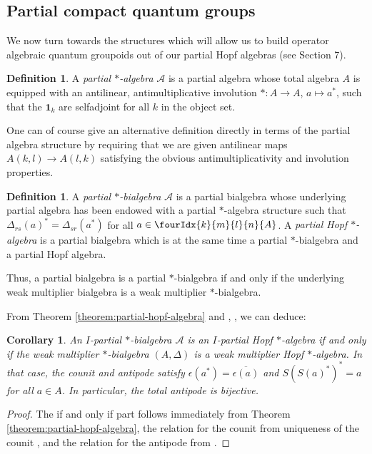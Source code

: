 \documentclass[11pt]{article}
\newcommand{\Gr}[5]{\fourIdx{#2}{#4}{#3}{#5}{#1}}%
\newtheorem{Cor}[Theorem]{Corollary}
\theoremstyle{definition}
\newtheorem{Def}[Theorem]{Definition}
\numberwithin{equation}{section}
\begin{document}
\subsection{Partial compact quantum groups}

We now turn towards the structures which will allow us to build operator algebraic quantum groupoids out of our partial Hopf algebras (see Section 7).
 
\begin{Def} A \emph{partial $*$-algebra} $\mathscr{A}$ is a partial
  algebra whose total algebra $A$ is equipped with an antilinear,
  antimultiplicative involution $*\colon A\rightarrow A$, $ a\mapsto
  a^*$,  such that the $\mathbf{1}_k$ are selfadjoint for all $k$ in
  the object set. 
\end{Def} 

One can of course give an alternative definition directly in terms of the partial algebra structure by requiring that we are given antilinear maps $A(k,l)\rightarrow A(l,k)$ satisfying the obvious antimultiplicativity and involution properties.

\begin{Def} A \emph{partial $*$-bialgebra} $\mathscr{A}$ is a
 partial bialgebra whose underlying partial algebra has been
  endowed with a partial $*$-algebra structure such that
$\Delta_{rs}(a)^* = \Delta_{sr}(a^*)$ for all $a \in \Gr{A}{k}{l}{m}{n}$.
A \emph{partial Hopf $*$-algebra} is a partial bialgebra which is at the same time a partial $*$-bialgebra and a partial Hopf algebra.
\end{Def} 
Thus, a partial bialgebra is a partial
$*$-bialgebra if and only if the underlying weak multiplier bialgebra
 is a weak multiplier $*$-bialgebra.

From Theorem \ref{theorem:partial-hopf-algebra} and \cite{Boh1},
\cite{VDW1}, we can deduce:
\begin{Cor} \label{cor:involutive}
  An $I$-partial $*$-bialgebra $\mathscr{A}$ is an $I$-partial Hopf
  $*$-algebra if and only if the weak multiplier $*$-bialgebra
  $(A,\Delta)$ is a weak multiplier Hopf $*$-algebra. In that case,
  the counit and antipode satisfy
  $\epsilon(a^{*})=\overline{\epsilon(a)}$ and $S(S(a)^{*})^{*}=a$ for
  all $a\in A$. In particular, the total antipode is bijective.
\end{Cor}
\begin{proof}
  The if and only if part follows immediately from  Theorem
  \ref{theorem:partial-hopf-algebra}, the relation for the counit  from
uniqueness of the counit  \cite[Theorem 2.8]{Boh1}, and the relation
for the antipode from \cite[Proposition 4.11]{VDW1}.
\end{proof}
\end{document}
